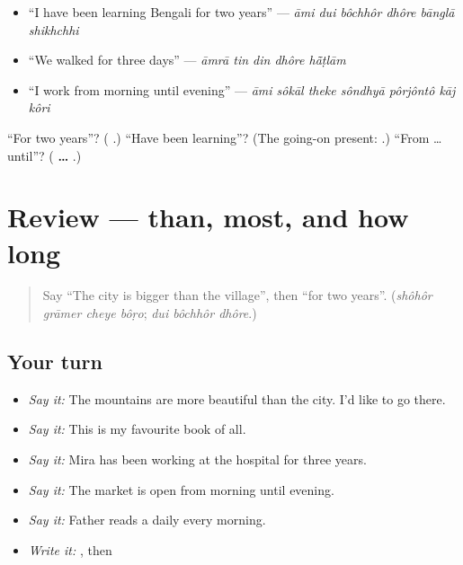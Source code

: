 \begin{itemize}
\raggedright
  \item \textquotedblleft{}I have been learning Bengali for two years\textquotedblright{} — \emph{āmi dui bôchhôr dhôre bānglā shikhchhi}
  \item \textquotedblleft{}We walked for three days\textquotedblright{} — \emph{āmrā tin din dhôre hā̃ṭlām}
  \item \textquotedblleft{}I work from morning until evening\textquotedblright{} — \emph{āmi sôkāl theke sôndhyā pôrjôntô kāj kôri}
\end{itemize}

\begin{tcolorbox}[breakable,colback=teal!4,colframe=teal!35!black,title={Before you move on}]
\textquotedblleft{}For two years\textquotedblright{}? (\textbf{  }.) \textquotedblleft{}Have been learning\textquotedblright{}? (The going-on present: \textbf{}.) \textquotedblleft{}From … until\textquotedblright{}? (\textbf{ … }.)
\end{tcolorbox}
\section[(review)]{Review — than, most, and how long}

\label{lesson:BN-R273-comparing-and-time}



\begin{quote}
Say \textquotedblleft{}The city is bigger than the village\textquotedblright{}, then \textquotedblleft{}for two years\textquotedblright{}. (\emph{shôhôr grāmer cheye bôṛo}; \emph{dui bôchhôr dhôre}.)
\end{quote}

\subsection*{Your turn}
\begin{itemize}
\raggedright
  \item \emph{Say it:} The mountains are more beautiful than the city. I'd like to go there.
  \item \emph{Say it:} This is my favourite book of all.
  \item \emph{Say it:} Mira has been working at the hospital for three years.
  \item \emph{Say it:} The market is open from morning until evening.
  \item \emph{Say it:} Father reads a daily every morning.
  \item \emph{Write it:} \textbf{}, then \textbf{}
\end{itemize}

